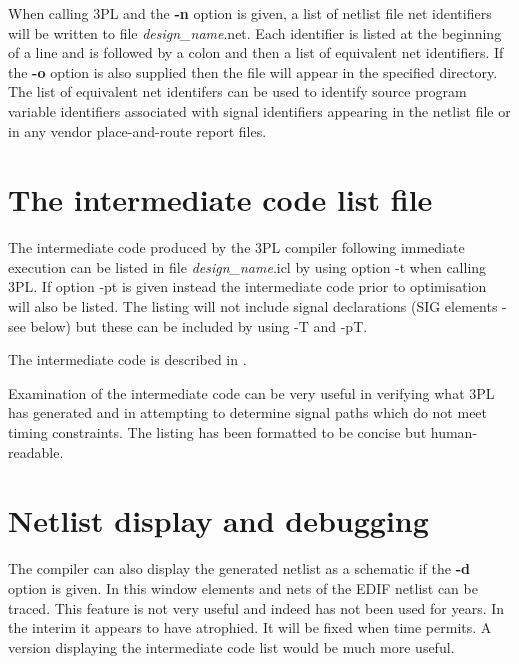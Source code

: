         When calling 3PL and the {\bf -n} option is given, a list of netlist
        file net identifiers will be written to file {\em design\_name}.net.
        Each identifier is listed at the beginning of a line and is followed
        by a colon and then a list of equivalent net identifiers. If the {\bf
        -o} option is also supplied then the file will appear in the
        specified directory. The list of equivalent net identifers can be
        used to identify source program variable identifiers associated with
        signal identifiers appearing in the netlist file or in any vendor
        place-and-route report files.
        
    \section{The intermediate code list file}
    
        The intermediate code produced by the 3PL compiler following immediate
        execution can be listed in file {\em design\_name}.icl by using option -t
        when calling 3PL. If option -pt is given instead the intermediate code
        prior to optimisation will also be listed. The listing will not include
        signal declarations (SIG elements - see below) but these can be included
        by using -T and -pT.
        
        The intermediate code is described in .
        
        Examination of the intermediate code can be very useful in verifying
        what 3PL has generated and in attempting to determine signal paths which
        do not meet timing constraints. The listing has been formatted to be
        concise but human-readable.
            
    \section{Netlist display and debugging}
    
        The compiler can also display the generated netlist as a schematic
        if the {\bf -d} option is given. In this window elements and nets of the
        EDIF netlist can be traced. This feature is not very useful and
        indeed has not been used for years. In the interim it appears to
        have atrophied. It will be fixed when time permits. A version
        displaying the intermediate code list would be much more useful.
        
